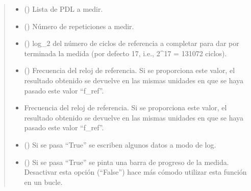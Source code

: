 \documentclass[letterpaper,10pt,english]{sphinxmanual}
\begin{document}
\begin{fulllineitems}
\begin{fulllineitems}
\begin{quote}
\begin{description}
\begin{itemize}
\item {} 
\sphinxAtStartPar
{} (\sphinxstyleliteralemphasis{\sphinxupquote{ | }}\sphinxstyleliteralemphasis{\sphinxupquote{(}}\sphinxstyleliteralemphasis{\sphinxupquote{)}}\sphinxstyleliteralemphasis{\sphinxupquote{, }}) \textendash{} Lista de PDL a medir.

\item {} 
\sphinxAtStartPar
{} (\sphinxstyleliteralemphasis{\sphinxupquote{, }}) \textendash{} Número de repeticiones a medir.

\item {} 
\sphinxAtStartPar
{} (\sphinxstyleliteralemphasis{\sphinxupquote{, }}) \textendash{} log\_2 del número de ciclos de referencia a completar para dar por terminada la medida (por defecto 17, i.e., 2\textasciicircum{}17 = 131072 ciclos).

\item {} 
\sphinxAtStartPar
{} () \textendash{} Frecuencia del reloj de referencia. Si se proporciona este valor, el resultado obtenido se devuelve en las mismas unidades en que se haya pasado este valor “f\_ref”.

\item {} 
\sphinxAtStartPar
{} \textendash{} Frecuencia del reloj de referencia. Si se proporciona este valor, el resultado obtenido se devuelve en las mismas unidades en que se haya pasado este valor “f\_ref”.

\item {} 
\sphinxAtStartPar
{} (\sphinxstyleliteralemphasis{\sphinxupquote{, }}) \textendash{} Si se pasa “True” se escriben algunos datos a modo de log.

\item {} 
\sphinxAtStartPar
{} (\sphinxstyleliteralemphasis{\sphinxupquote{, }}) \textendash{} Si se pasa “True” se pinta una barra de progreso de la medida. Desactivar esta opción (“False”) hace más cómodo utilizar esta función en un bucle.


\end{itemize}
\end{description}
\end{quote}
\end{fulllineitems}
\end{fulllineitems}
\end{document}
